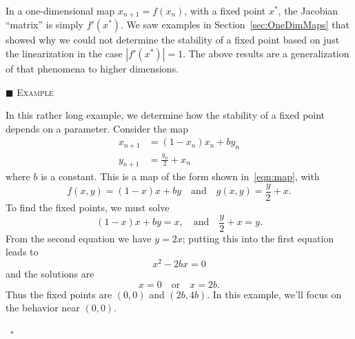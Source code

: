 \documentclass[reqno]{immbook}
\numberwithin{equation}{chapter}
\numberwithin{question}{section}
\numberwithin{theorem}{chapter}
\numberwithin{figure}{chapter}
\theoremstyle{definition}
\newenvironment{xexample}%
{%

\medskip\noindent\addtocounter{example}{1}$\blacksquare$ \textsc{Example \theexample}\hspace*{1em}%
}%
{%
~\hfill$\square$

\medskip
}
\begin{document}
In a one-dimensional map $x_{n+1} = f(x_n)$, with a fixed
point $x^*$, the 
Jacobian ``matrix'' is simply $f'(x^*)$.  We saw examples
in Section~\ref{sec:OneDimMaps} that showed why we could not determine
the stability of a fixed point based on just the linearization
in the case $|f'(x^*)|=1$.  The above results are a generalization
of that phenomena to higher dimensions.


\begin{xexample}
In this rather long example, we determine
how the stability of a fixed point depends on a parameter.
Consider the map
\begin{equation}
\begin{split}
  x_{n+1} & = (1- x_n)x_n + b y_n \\
  y_{n+1} & = \frac{y_n}{2} + x_n
\end{split}
\label{eqn:linearizationexample}
\end{equation}
where $b$ is a constant.
This is a map of the form shown in~\eqref{eqn:map}, with
\begin{equation}
   f(x,y) = (1-x)x+by \quad \textrm{and} \quad g(x,y) = \frac{y}{2}+x.
\end{equation}
To find the fixed points, we must solve
\begin{equation}
   (1 - x)x + by = x, \quad \textrm{and} \quad \frac{y}{2}+x = y.
\end{equation}
From the second equation we have $y = 2x$; putting this into the first equation
leads to
\begin{equation}
   x^2-2bx = 0
\end{equation}
and the solutions are
\begin{equation}
  x = 0 \quad \textrm{or} \quad x= 2b.
\end{equation}
Thus the fixed points are
$(0,0)$ and $(2b,4b)$.
In this example, we'll focus on the behavior near $(0,0)$.


\end{xexample}
\end{document}
